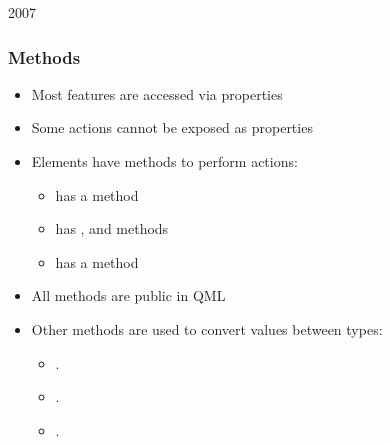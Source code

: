 \begin{slide}{2007}\frametitle{Methods}

\begin{itemize}
\item Most features are accessed via properties
\item Some actions cannot be exposed as properties
\item Elements have methods to perform actions:
  \begin{itemize}
  \item {} has a  method
  \item {} has , 
        and  methods
  \item {} has a  method
  \end{itemize}
\item All methods are public in QML
\item Other methods are used to convert values between types:
  \begin{itemize}
  \item {}.
  \item {}.
  \item {}.
  \end{itemize}
\end{itemize}

\end{slide}


